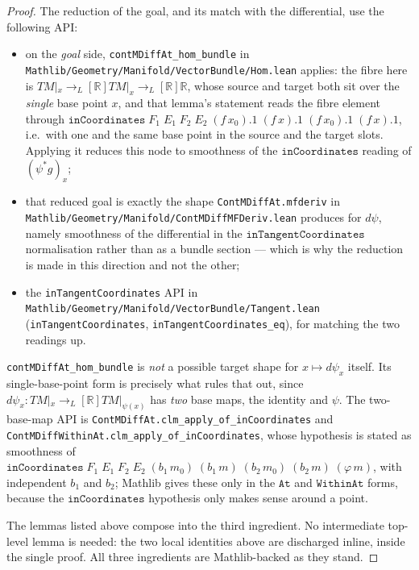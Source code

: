 \begin{proof}
    The reduction of the goal, and its match with the differential, use the following API:
    \begin{itemize}
        \item on the \emph{goal} side, \texttt{contMDiffAt\_hom\_bundle} in \texttt{Mathlib/Geometry/Manifold/VectorBundle/Hom.lean} applies: the fibre here is $TM|_x \to_L[\mathbb{R}] TM|_x \to_L[\mathbb{R}] \mathbb{R}$, whose source and target both sit over the \emph{single} base point $x$, and that lemma's statement reads the fibre element through $\mathtt{inCoordinates}\;F_1\;E_1\;F_2\;E_2\;(f\,x_0).1\;(f\,x).1\;(f\,x_0).1\;(f\,x).1$, i.e.\ with one and the same base point in the source and the target slots. Applying it reduces this node to smoothness of the $\mathtt{inCoordinates}$ reading of $(\psi^*g)_x$;
        \item that reduced goal is exactly the shape \texttt{ContMDiffAt.mfderiv} in \texttt{Mathlib/Geometry/Manifold/ContMDiffMFDeriv.lean} produces for $d\psi$, namely smoothness of the differential in the $\mathtt{inTangentCoordinates}$ normalisation rather than as a bundle section --- which is why the reduction is made in this direction and not the other;
        \item the \texttt{inTangentCoordinates} API in \texttt{Mathlib/Geometry/Manifold/VectorBundle/Tangent.lean} (\texttt{inTangentCoordinates}, \texttt{inTangentCoordinates\_eq}), for matching the two readings up.
    \end{itemize}
    \texttt{contMDiffAt\_hom\_bundle} is \emph{not} a possible target shape for $x \mapsto d\psi_x$ itself. Its single-base-point form is precisely what rules that out, since $d\psi_x : TM|_x \to_L[\mathbb{R}] TM|_{\psi(x)}$ has \emph{two} base maps, the identity and $\psi$. The two-base-map API is \texttt{ContMDiffAt.clm\_apply\_of\_inCoordinates} and \texttt{ContMDiffWithinAt.clm\_apply\_of\_inCoordinates}, whose hypothesis is stated as smoothness of $\mathtt{inCoordinates}\;F_1\;E_1\;F_2\;E_2\;(b_1\,m_0)\;(b_1\,m)\;(b_2\,m_0)\;(b_2\,m)\;(\varphi\,m)$, with independent $b_1$ and $b_2$; Mathlib gives these only in the $\mathtt{At}$ and $\mathtt{WithinAt}$ forms, because the $\mathtt{inCoordinates}$ hypothesis only makes sense around a point.

    The lemmas listed above compose into the third ingredient. No intermediate top-level lemma is needed: the two local identities above are discharged inline, inside the single proof. All three ingredients are Mathlib-backed as they stand.
\end{proof}

